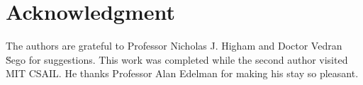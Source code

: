 \documentclass[11pt,conference,compsocconf]{IEEEtran}
\theoremstyle{definition}
\begin{document}
\section*{Acknowledgment}


The authors are grateful to Professor Nicholas J. Higham and Doctor Vedran \u Sego for suggestions.
This work was completed while the second author visited MIT CSAIL. He thanks 
Professor Alan Edelman for making his stay so pleasant. 



%
%
%





\end{document}
